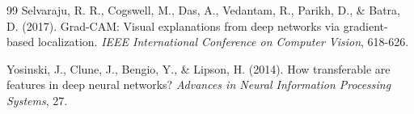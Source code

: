 \documentclass[11pt,a4paper]{article}
\begin{document}
\begin{thebibliography}{99}
Selvaraju, R. R., Cogswell, M., Das, A., Vedantam, R., Parikh, D., \& Batra, D. (2017).
Grad-CAM: Visual explanations from deep networks via gradient-based localization.
\textit{IEEE International Conference on Computer Vision}, 618-626.

Yosinski, J., Clune, J., Bengio, Y., \& Lipson, H. (2014).
How transferable are features in deep neural networks?
\textit{Advances in Neural Information Processing Systems}, 27.

\end{thebibliography}
\end{document}
